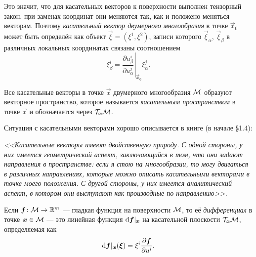 Это значит, что для касательных векторов к поверхности выполнен тензорный закон, при заменах координат они меняются так, как и положено меняться векторам. Поэтому \textit{касательный вектор двумерного многообразия} в точке $\vec{x}_0$ может быть определён как объект $\vec{\xi} = (\xi^1, \xi^2)$, записи которого $\vec{\xi}_\alpha$, $\vec{\xi}_\beta$ в различных локальных координатах связаны соотношением
\[
	\xi_\beta^i = \left.\frac{\partial u_\beta^i}{\partial u_\alpha^j}\right|_{\vec{x}_0}\xi^j_\alpha.
\]

\begin{definition}
	Все касательные векторы в точке $\vec{x}$ двумерного многообразия $\mathcal{M}$ образуют векторное пространство, которое называется \textit{касательным пространством} в точке $\vec{x}$ и обозначается через $\mathcal{T}_{\boldsymbol{x}}\mathcal{M}$.
\end{definition}

\noindent
Ситуация с касательными векторами хорошо описывается в книге \cite{S19} (в начале \S 1{.}4):

\begin{center}
	\begin{minipage}{.9\textwidth} \centering
		\textit{<<Касательные векторы имеют двойственную природу. С одной стороны, у них имеется геометрический аспект, заключающийся в том, что они задают направления в пространстве: если я стою на многообразии, то могу двигаться в различных направлениях, которые можно описать касательными векторами в точке моего положения. С другой стороны, у них имеется аналитический аспект, в котором они выступают как \glqq производные по направлению\grqq>>.}
	\end{minipage}
\end{center}

%
\begin{definition}
	Если $\boldsymbol{f}\colon\mathcal{M} \to \mathbb{R}^m$ --- гладкая функция на поверхности $\mathcal{M}$, то её \textit{дифференциал} в точке $\boldsymbol{x} \in \mathcal{M}$ --- это линейная функция $\mathop{}\!\mathrm{d}\boldsymbol{f}|_{\boldsymbol{x}}$ на касательной плоскости $\mathcal{T}_{\boldsymbol{x}}\mathcal{M}$, определяемая как
	\[
		\mathop{}\!\mathrm{d}\boldsymbol{f}|_{\boldsymbol{x}}(\boldsymbol{\xi}) = \xi^i\frac{\partial \boldsymbol{f}}{\partial u^i}.
	\]
\end{definition}

